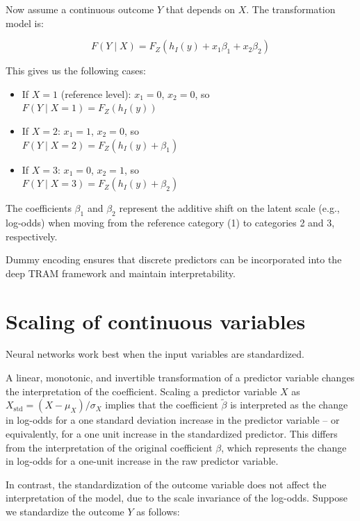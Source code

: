 Now assume a continuous outcome $Y$ that depends on $X$. The transformation model is:

\[
F(Y \mid X) = F_Z(h_I(y) + x_1 \beta_1 + x_2 \beta_2)
\]

This gives us the following cases:
\begin{itemize}
  \item If $X = 1$ (reference level): $x_1 = 0$, $x_2 = 0$, so \\
  $F(Y \mid X=1) = F_Z(h_I(y))$
  \item If $X = 2$: $x_1 = 1$, $x_2 = 0$, so \\
  $F(Y \mid X=2) = F_Z(h_I(y) + \beta_1)$
  \item If $X = 3$: $x_1 = 0$, $x_2 = 1$, so \\
  $F(Y \mid X=3) = F_Z(h_I(y) + \beta_2)$
\end{itemize}

The coefficients $\beta_1$ and $\beta_2$ represent the additive shift on the latent scale (e.g., log-odds) when moving from the reference category (1) to categories 2 and 3, respectively.

Dummy encoding ensures that discrete predictors can be incorporated into the deep TRAM framework and maintain interpretability.



\section{Scaling of continuous variables} \label{sec:scaling_continuous_variables}

Neural networks work best when the input variables are standardized. 

A linear, monotonic, and invertible transformation of a predictor variable changes the interpretation of the coefficient. Scaling a predictor variable $X$ as $X_{\text{std}} = (X - \mu_X) / \sigma_X$ implies that the coefficient $\tilde{\beta}$ is interpreted as the change in log-odds for a one standard deviation increase in the predictor variable -- or equivalently, for a one unit increase in the standardized predictor. This differs from the interpretation of the original coefficient $\beta$, which represents the change in log-odds for a one-unit increase in the raw predictor variable.


In contrast, the standardization of the outcome variable does not affect the interpretation of the model, due to the scale invariance of the log-odds. Suppose we standardize the outcome $Y$ as follows:

